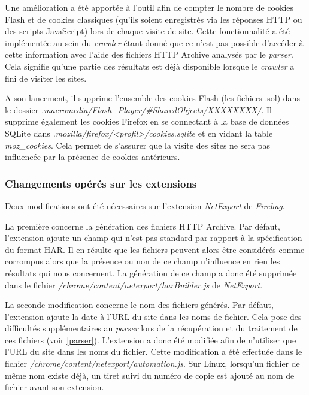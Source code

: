 Une amélioration a été apportée à l'outil afin de compter le nombre de cookies Flash et de cookies classiques (qu'ils soient enregistrés via les réponses HTTP ou des scripts JavaScript) lors de chaque visite de site. Cette fonctionnalité a été implémentée au sein du \textit{crawler} étant donné que ce n'est pas possible d'accéder à cette information avec l'aide des fichiers HTTP Archive analysés par le \textit{parser}. Cela signifie qu'une partie des résultats est déjà disponible lorsque le \textit{crawler} a fini de visiter les sites.

A son lancement, il supprime l'ensemble des cookies Flash (les fichiers .sol) dans le dossier \textit{.macromedia/Flash\_Player/\#SharedObjects/XXXXXXXX/}. Il supprime également les cookies Firefox en se connectant à la base de données SQLite dans \textit{.mozilla/firefox/<profil>/cookies.sqlite} et en vidant la table \textit{moz\_cookies}. Cela permet de s'assurer que la visite des sites ne sera pas influencée par la présence de cookies antérieurs.

\subsubsection{Changements opérés sur les extensions}
Deux modifications ont été nécessaires sur l'extension \textit{NetExport} de \textit{Firebug}.

La première concerne la génération des fichiers HTTP Archive. Par défaut, l'extension ajoute un champ qui n'est pas standard par rapport à la spécification du format HAR. Il en résulte que les fichiers peuvent alors être considérés comme corrompus alors que la présence ou non de ce champ n'influence en rien les résultats qui nous concernent. La génération de ce champ a donc été supprimée dans le fichier \textit{/chrome/content/netexport/harBuilder.js} de \textit{NetExport}.

La seconde modification concerne le nom des fichiers générés. Par défaut, l'extension ajoute la date à l'URL du site dans les noms de fichier. Cela pose des difficultés supplémentaires au \textit{parser} lors de la récupération et du traitement de ces fichiers (voir \autoref{parser}). L'extension a donc été modifiée afin de n'utiliser que l'URL du site dans les noms du fichier. Cette modification a été effectuée dans le fichier \textit{/chrome/content/netexport/automation.js}. Sur Linux, lorsqu'un fichier de même nom existe déjà, un tiret suivi du numéro de copie est ajouté au nom de fichier avant son extension.


